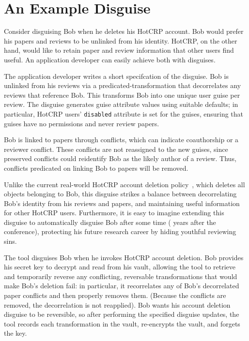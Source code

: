 \section{An Example Disguise}
\label{design:eg}
%
Consider disguising Bob when he deletes his HotCRP account.
%
Bob would prefer his papers and reviews to be unlinked from his identity.
%
HotCRP, on the other hand, would like to retain paper and review information that other users
find useful.
%
An application developer can easily achieve both with disguises.
%

The application developer writes a short specifcation of the disguise. Bob is unlinked from his
reviews via a predicated-transformation that decorrelates any reviews that reference Bob.
%
This transforms Bob into one unique user guise per review.
%
The disguise generates guise attribute values using suitable defaults;
%
in particular, HotCRP users' \texttt{disabled} attribute is set for the guises, ensuring that guises
have no permissions and never review papers.
%

%
Bob is linked to papers through conflicts, which can indicate coauthorship or a reviewer conflict.
%
These conflicts are not reassigned to the new guises, since preserved conflicts could reidentify Bob
as the likely author of a review. Thus, conflicts predicated on linking Bob to papers will be
removed.

Unlike the current real-world HotCRP account deletion policy~\cite{hotcrp:privacy}, which deletes
all objects belonging to Bob, this disguise strikes a balance between decorrelating Bob's identity
from his reviews and papers, and maintaining useful information for other HotCRP users.
%
Furthermore, it is easy to imagine extending this disguise to automatically disguise Bob after some
time ( years after the conference), protecting his future research career by hiding youthful
reviewing sins.
%

The tool disguises Bob when he invokes HotCRP account deletion. Bob provides his secret key to
decrypt and read from his vault, allowing the tool to retrieve and temporarily reverse any conflicting,
reversable transformations that would make Bob's deletion fail: in particular, it recorrelates any
of Bob's decorrelated paper conflicts and then properly removes them. (Because the conflicts are
removed, the decorrelation is not reapplied).  Bob wants his account deletion disguise to be
reversible, so after performing the specified disguise updates, the tool records each transformation
in the vault, re-encrypts the vault, and forgets the key.

